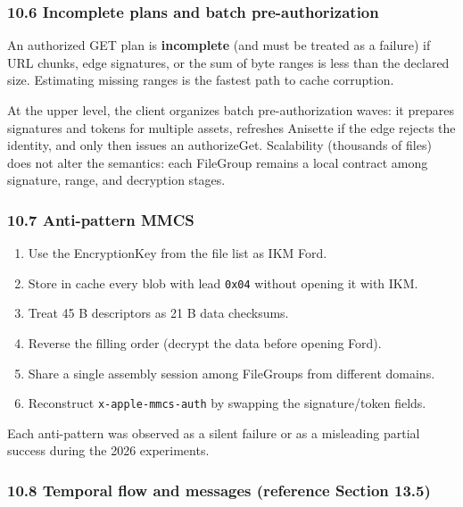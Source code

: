 \documentclass[
  english,
  10pt]{article}
\providecommand{\tightlist}{%
  \setlength{\itemsep}{0pt}\setlength{\parskip}{0pt}}
\begin{document}
\subsubsection{10.6 Incomplete plans and batch
pre-authorization}\label{incomplete-plans-and-batch-pre-authorization}

An authorized GET plan is \textbf{incomplete} (and must be treated as a
failure) if URL chunks, edge signatures, or the sum of byte ranges is
less than the declared size. Estimating missing ranges is the fastest
path to cache corruption.

At the upper level, the client organizes batch pre-authorization waves:
it prepares signatures and tokens for multiple assets, refreshes
Anisette if the edge rejects the identity, and only then issues an
authorizeGet. Scalability (thousands of files) does not alter the
semantics: each FileGroup remains a local contract among signature,
range, and decryption stages.

\subsubsection{10.7 Anti-pattern MMCS}\label{anti-pattern-mmcs}

\begin{enumerate}
\def\labelenumi{\arabic{enumi}.}
\tightlist
\item
  Use the EncryptionKey from the file list as IKM Ford.
\item
  Store in cache every blob with lead \texttt{0x04} without opening it
  with IKM.
\item
  Treat 45 B descriptors as 21 B data checksums.
\item
  Reverse the filling order (decrypt the data before opening Ford).
\item
  Share a single assembly session among FileGroups from different
  domains.
\item
  Reconstruct \texttt{x-apple-mmcs-auth} by swapping the signature/token
  fields.
\end{enumerate}

Each anti-pattern was observed as a silent failure or as a misleading
partial success during the 2026 experiments.

\subsubsection{10.8 Temporal flow and messages (reference Section
13.5)}\label{temporal-flow-and-messages-reference-section-13.5}
\end{document}
